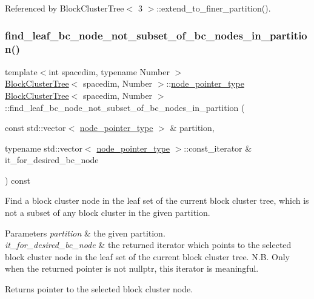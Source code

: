 Referenced by Block\+Cluster\+Tree$<$ 3 $>$\+::extend\+\_\+to\+\_\+finer\+\_\+partition().

\mbox{\label{classBlockClusterTree_a97a99684ebd9ed470a79e56b73374068}} 
\subsubsection{\texorpdfstring{find\+\_\+leaf\+\_\+bc\+\_\+node\+\_\+not\+\_\+subset\+\_\+of\+\_\+bc\+\_\+nodes\+\_\+in\+\_\+partition()}{find\_leaf\_bc\_node\_not\_subset\_of\_bc\_nodes\_in\_partition()}}
{\footnotesize\ttfamily template$<$int spacedim, typename Number $>$ \\
\hyperlink{classBlockClusterTree}{Block\+Cluster\+Tree}$<$ spacedim, Number $>$\+::\hyperlink{classTreeNode}{node\+\_\+pointer\+\_\+type} \hyperlink{classBlockClusterTree}{Block\+Cluster\+Tree}$<$ spacedim, Number $>$\+::find\+\_\+leaf\+\_\+bc\+\_\+node\+\_\+not\+\_\+subset\+\_\+of\+\_\+bc\+\_\+nodes\+\_\+in\+\_\+partition (\begin{DoxyParamCaption}\item[{const std\+::vector$<$ \hyperlink{classTreeNode}{node\+\_\+pointer\+\_\+type} $>$ \&}]{partition,  }\item[{typename std\+::vector$<$ \hyperlink{classTreeNode}{node\+\_\+pointer\+\_\+type} $>$\+::const\+\_\+iterator \&}]{it\+\_\+for\+\_\+desired\+\_\+bc\+\_\+node }\end{DoxyParamCaption}) const\hspace{0.3cm}{\ttfamily [private]}}

Find a block cluster node in the leaf set of the current block cluster tree, which is not a subset of any block cluster in the given partition. 
\begin{DoxyParams}{Parameters}
{\em partition} & the given partition. \\
\hline
{\em it\+\_\+for\+\_\+desired\+\_\+bc\+\_\+node} & the returned iterator which points to the selected block cluster node in the leaf set of the current block cluster tree. N.\+B. Only when the returned pointer is not {\ttfamily nullptr}, this iterator is meaningful. \\
\hline
\end{DoxyParams}
\begin{DoxyReturn}{Returns}
pointer to the selected block cluster node. 
\end{DoxyReturn}

